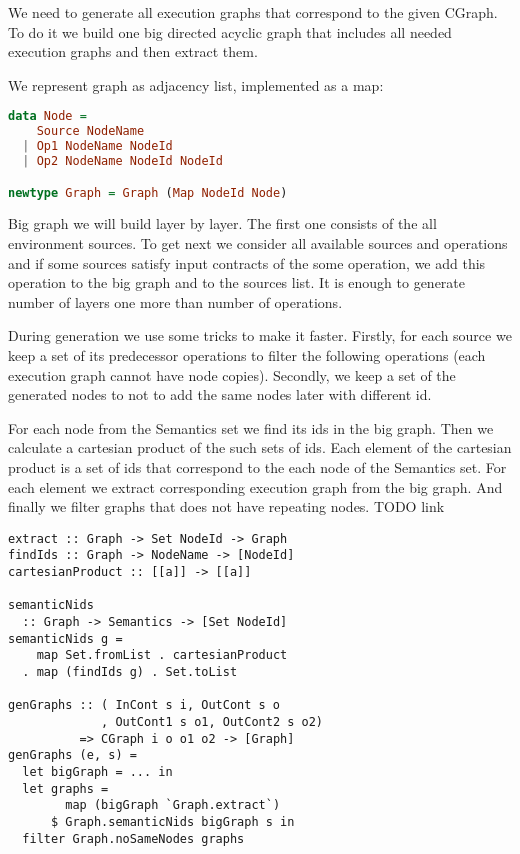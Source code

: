 We need to generate all execution graphs that correspond to the given CGraph.
To do it we build one big directed acyclic graph that includes all needed execution graphs and then extract them.

We represent graph as adjacency list, implemented as a map:

\begin{lstlisting}[language=Haskell]
data Node =
    Source NodeName
  | Op1 NodeName NodeId
  | Op2 NodeName NodeId NodeId

newtype Graph = Graph (Map NodeId Node)
\end{lstlisting}

Big graph we will build layer by layer.
The first one consists of the all environment sources.
To get next we consider all available sources and operations and if some sources satisfy input contracts of the some operation, we add this operation to the big graph and to the sources list.
It is enough to generate number of layers one more than number of operations.

During generation we use some tricks to make it faster.
Firstly, for each source we keep a set of its predecessor operations to filter the following operations (each execution graph cannot have node copies).
Secondly, we keep a set of the generated nodes to not to add the same nodes later with different id.

For each node from the Semantics set we find its ids in the big graph.
Then we calculate a cartesian product of the such sets of ids.
Each element of the cartesian product is a set of ids that correspond to the each node of the Semantics set.
For each element we extract corresponding execution graph from the big graph.
And finally we filter graphs that does not have repeating nodes.
TODO link 

\begin{lstlisting}[languages=Haskell]
extract :: Graph -> Set NodeId -> Graph
findIds :: Graph -> NodeName -> [NodeId]
cartesianProduct :: [[a]] -> [[a]]

semanticNids 
  :: Graph -> Semantics -> [Set NodeId]
semanticNids g = 
    map Set.fromList . cartesianProduct 
  . map (findIds g) . Set.toList

genGraphs :: ( InCont s i, OutCont s o
             , OutCont1 s o1, OutCont2 s o2) 
          => CGraph i o o1 o2 -> [Graph]
genGraphs (e, s) = 
  let bigGraph = ... in
  let graphs = 
        map (bigGraph `Graph.extract`) 
      $ Graph.semanticNids bigGraph s in
  filter Graph.noSameNodes graphs
\end{lstlisting}
